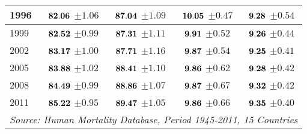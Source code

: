 \documentclass[10pt, titlepage]{article}%
\begin{document}
\begin{table}
\begin{tabular}{||l|c|c|c|c||}
  1996 &  $\bf 82.06$ $\pm 1.06$& $\bf 87.04$ $\pm 1.09$& $\bf 10.05$ $\pm 0.47$& $\bf 9.28$ $\pm 0.54$ \\ \hline\hline
  1999 &  $\bf 82.52$ $\pm 0.99$& $\bf 87.31$ $\pm 1.11$& $\bf 9.91$ $\pm 0.52$& $\bf 9.26$ $\pm 0.44$ \\ \hline\hline
  2002 &  $\bf 83.17$ $\pm 1.00$& $\bf 87.71$ $\pm 1.16$& $\bf 9.87$ $\pm 0.54$& $\bf 9.25$ $\pm 0.41$ \\ \hline\hline
  2005 &  $\bf 83.88$ $\pm 1.02$& $\bf 88.41$ $\pm 1.10$& $\bf 9.86$ $\pm 0.62$& $\bf 9.28$ $\pm 0.42$ \\ \hline\hline
  2008 &  $\bf 84.49$ $\pm 0.99$& $\bf 88.86$ $\pm 1.07$& $\bf 9.87$ $\pm 0.67$& $\bf 9.32$ $\pm 0.42$ \\ \hline\hline
  2011 &  $\bf 85.22$ $\pm 0.95$& $\bf 89.47$ $\pm 1.05$& $\bf 9.86$ $\pm 0.66$& $\bf 9.35$ $\pm 0.40$ \\ \hline\hline

              
\multicolumn{5}{||r||}{{\em Source: Human Mortality Database, Period 1945-2011, 15 Countries}} \\ \hline\hline
\end{tabular}
\label{table5a}
\end{table}
\end{document}
